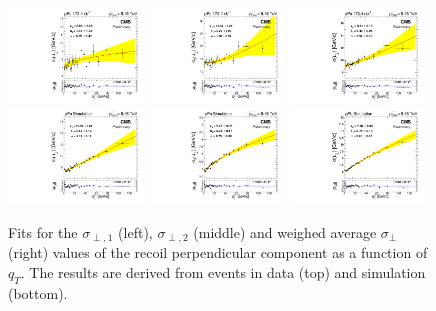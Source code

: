\begin{figure}[htb!]
 \centering
 \includegraphics[width=0.32\textwidth]{Figures/WBoson/Analysis/Correction/Recoil/RecoilFitsqT/Data/fitPFu2sigma1.pdf}
 \includegraphics[width=0.32\textwidth]{Figures/WBoson/Analysis/Correction/Recoil/RecoilFitsqT/Data/fitPFu2sigma2.pdf}
 \includegraphics[width=0.32\textwidth]{Figures/WBoson/Analysis/Correction/Recoil/RecoilFitsqT/Data/fitPFu2sigma.pdf} \\
 \includegraphics[width=0.32\textwidth]{Figures/WBoson/Analysis/Correction/Recoil/RecoilFitsqT/MC/fitPFu2sigma1.pdf}
 \includegraphics[width=0.32\textwidth]{Figures/WBoson/Analysis/Correction/Recoil/RecoilFitsqT/MC/fitPFu2sigma2.pdf}
 \includegraphics[width=0.32\textwidth]{Figures/WBoson/Analysis/Correction/Recoil/RecoilFitsqT/MC/fitPFu2sigma.pdf}
 \caption{Fits for the $\sigma_{\perp,1}$ (left), $\sigma_{\perp,2}$ (middle) and weighed average $\sigma_{\perp}$ (right) values of the recoil perpendicular component as a function of $q_{T}$. The results are derived from \ZToMuMu events in data (top) and simulation (bottom).}
 \label{fig:figU2RecoilResolutionFit}
\end{figure}

